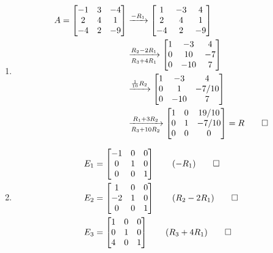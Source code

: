 \documentclass[12pt, a4paper]{article}
\begin{document}
\begin{enumerate}[Q\arabic*.]
    \begin{enumerate}[label=(b\roman*)]
      \item \begin{align*}
          A = \begin{bmatrix}-1&3&-4\\2&4&1\\-4&2&-9\end{bmatrix} &\xrightarrow{-R_1}
          \begin{bmatrix}1&-3&4\\2&4&1\\-4&2&-9\end{bmatrix} \\&\xrightarrow[R_3+4R_1]{R_2-2R_1} 
          \begin{bmatrix}1&-3&4\\0&10&-7\\0&-10&7\end{bmatrix}\\&\xrightarrow{\frac{1}{10}R_2}
          \begin{bmatrix}1&-3&4\\0&1&-7/10\\0&-10&7\end{bmatrix}\\&\xrightarrow[R_3+10R_2]{R_1+3R_2}
          \begin{bmatrix}1&0&19/10\\0&1&-7/10\\0&0&0\end{bmatrix} = R \qed
        \end{align*}
      \item \begin{align*}
          E_1 &= \begin{bmatrix}-1&0&0\\0&1&0\\0&0&1\end{bmatrix}\tag*{($-R_1$)} \qed\\
          E_2 &= \begin{bmatrix}1&0&0\\-2&1&0\\0&0&1\end{bmatrix}\tag*{($R_2-2R_1$)} \qed\\
          E_3 &= \begin{bmatrix}1&0&0\\0&1&0\\4&0&1\end{bmatrix}\tag*{($R_3+4R_1$)} \qed\\

\end{align*}
\end{enumerate}
\end{enumerate}
\end{document}
